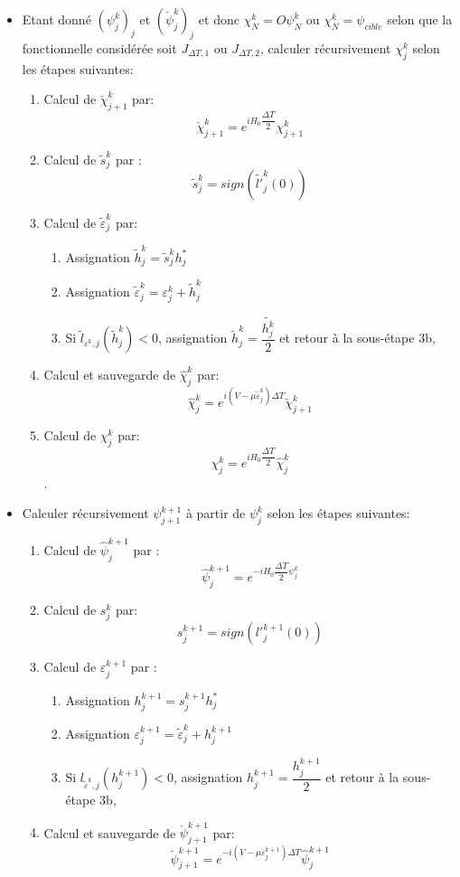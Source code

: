 \begin{itemize}
	\item[\textbullet] Etant donné $(\psi_j^k)_j$ et $(\check{\psi}_j^k)_j$ et donc $\chi_N^k = O\psi_N^k$ ou $\chi_N^k = \psi_{cible}$ selon que la fonctionnelle considérée soit $J_{\Delta T,1}$ ou $J_{\Delta T, 2}$, calculer récursivement $\chi_{j}^k$ selon les étapes suivantes:
	
	\begin{enumerate}
		\item Calcul de $\check{\chi}_{j+1}^k $ par: $$\check{\chi}_{j+1}^k= e^{iH_0 \dfrac{\Delta T}{2}} \chi_{j+1}^k$$
		\item Calcul de $\tilde{s}_j^k$ par :
		$$\tilde{s}_j^k = sign(\tilde{l'}_j^{k}(0))$$
		\item Calcul de $\tilde{\varepsilon}_j^k$ par:
		
		\begin{enumerate}
			\item Assignation $\tilde{h}_j^k= \tilde{s}_j^k h_j^*$
			\item Assignation $\tilde{\varepsilon}_j^k = \varepsilon_j^k + \tilde{h}_j^k$
			\item Si $\tilde{l}_{\varepsilon^k,j}(\tilde{h}_j^k)<0$, assignation $\tilde{h}_j^k = \dfrac{\tilde{h_j^k}}{2}$ et retour à la sous-étape 3b,
		\end{enumerate}
		
		\item Calcul et sauvegarde de $\widehat{\chi}_j^k$ par: $$\widehat{\chi}_j^k = e^{i(V-\mu \tilde{\varepsilon}_j^k)\Delta T} \check{\chi}_{j+1}^k$$
		
		\item Calcul de $\chi_j^k$ par:
		$$\chi_j^k = e^{iH_0 \dfrac{\Delta T}{2}} \widehat{\chi}_j^k$$.		
	\end{enumerate}
	\item[\textbullet] Calculer récursivement $\psi_{j+1}^{k+1}$ à partir de $\psi_j^k$ selon les étapes suivantes:
	
	\begin{enumerate}
		\item Calcul de $\widehat{\psi}_j^{k+1}$ par : $$ \widehat{\psi}_j^{k+1} = e^{-i H_0 \dfrac{\Delta T}{2} \psi_j^k} $$
		\item Calcul de $s_j^k$ par:
		$$s_j^{k+1} = sign({l'}_j^{k+1}(0))$$
	
	
	\item Calcul de $\varepsilon_j^{k+1}$ par :
	
		\begin{enumerate}
		\item Assignation $h_j^{k+1} = s_j^{k+1} h_j^*$
		\item Assignation $\varepsilon_j^{k+1} = \tilde{\varepsilon}_j^k + h_j^{k+1}$
		\item Si $l_{\tilde{\varepsilon}^k,j} (h_j^{k+1}) < 0$, assignation $h_j^{k+1} = \dfrac{h_j^{k+1}}{2}$ et retour à la sous-étape 3b,
		\end{enumerate}
	\item Calcul et sauvegarde de $\check{\psi}_{j+1}^{k+1}$ par:
	$$\check{\psi}_{j+1}^{k+1} = e^{-i(V- \mu \varepsilon_j^{k+1}) \Delta T} \widehat{\psi}_j^{k+1}$$
	

\end{enumerate}
\end{itemize}
